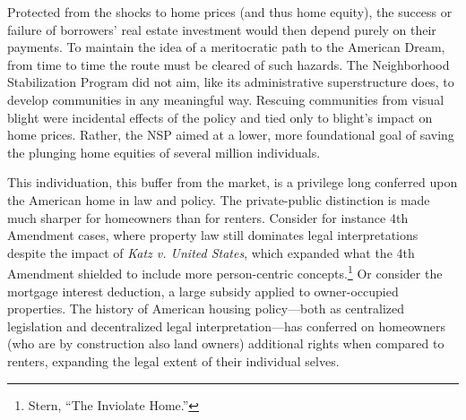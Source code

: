 \documentclass[
]{article}
\let\rmarkdownfootnote\footnote%
\def\footnote{\protect\rmarkdownfootnote}
\begin{document}
Protected from the shocks to home prices (and thus home equity), the
success or failure of borrowers' real estate investment would then
depend purely on their payments. To maintain the idea of a meritocratic
path to the American Dream, from time to time the route must be cleared
of such hazards. The Neighborhood Stabilization Program did not aim,
like its administrative superstructure does, to develop communities in
any meaningful way. Rescuing communities from visual blight were
incidental effects of the policy and tied only to blight's impact on
home prices. Rather, the NSP aimed at a lower, more foundational goal of
saving the plunging home equities of several million individuals.

This individuation, this buffer from the market, is a privilege long
conferred upon the American home in law and policy. The private-public
distinction is made much sharper for homeowners than for renters.
Consider for instance 4th Amendment cases, where property law still
dominates legal interpretations despite the impact of \emph{Katz v.
United States}, which expanded what the 4th Amendment shielded to
include more person-centric concepts.\footnote{Stern, ``The Inviolate
  Home.''} Or consider the mortgage interest deduction, a large subsidy
applied to owner-occupied properties. The history of American housing
policy---both as centralized legislation and decentralized legal
interpretation---has conferred on homeowners (who are by construction
also land owners) additional rights when compared to renters, expanding
the legal extent of their individual selves.
\end{document}
